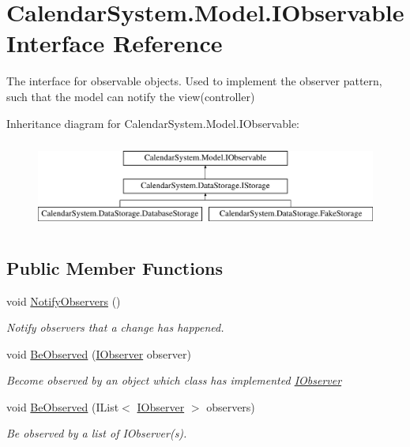 \hypertarget{interface_calendar_system_1_1_model_1_1_i_observable}{\section{Calendar\+System.\+Model.\+I\+Observable Interface Reference}
\label{interface_calendar_system_1_1_model_1_1_i_observable}
}


The interface for observable objects. Used to implement the observer pattern, such that the model can notify the view(controller)  


Inheritance diagram for Calendar\+System.\+Model.\+I\+Observable\+:\begin{figure}[H]
\begin{center}
\leavevmode
\includegraphics[height=2.926829cm]{interface_calendar_system_1_1_model_1_1_i_observable}
\end{center}
\end{figure}
\subsection*{Public Member Functions}
\begin{DoxyCompactItemize}
\item 
void \hyperlink{interface_calendar_system_1_1_model_1_1_i_observable_aee5d17758abde1cd470266ede5fab0c1}{Notify\+Observers} ()
\begin{DoxyCompactList}\small\item\em Notify observers that a change has happened. \end{DoxyCompactList}\item 
void \hyperlink{interface_calendar_system_1_1_model_1_1_i_observable_a23ca77451b9e6b19cdc111e0ef5f87c6}{Be\+Observed} (\hyperlink{interface_calendar_system_1_1_model_1_1_i_observer}{I\+Observer} observer)
\begin{DoxyCompactList}\small\item\em Become observed by an object which class has implemented \hyperlink{interface_calendar_system_1_1_model_1_1_i_observer}{I\+Observer} \end{DoxyCompactList}\item 
void \hyperlink{interface_calendar_system_1_1_model_1_1_i_observable_a53350aea0b6bf4ef1266d5d955db4700}{Be\+Observed} (I\+List$<$ \hyperlink{interface_calendar_system_1_1_model_1_1_i_observer}{I\+Observer} $>$ observers)
\begin{DoxyCompactList}\small\item\em Be observed by a list of I\+Observer(s). \end{DoxyCompactList}\end{DoxyCompactItemize}


